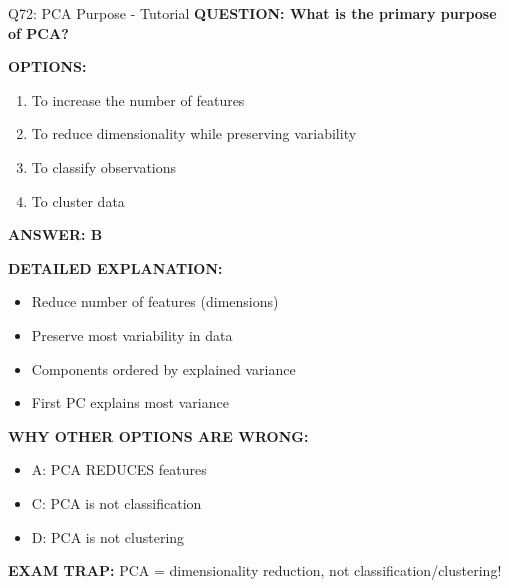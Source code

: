 \documentclass[8pt]{beamer}
\begin{document}
	\begin{frame}{Q72: PCA Purpose - Tutorial}
		\fontsize{6.5}{7.5}\selectfont
		\textbf{QUESTION: What is the primary purpose of PCA?}
		
		\vspace{0.1cm}
		\textbf{OPTIONS:}
		\begin{enumerate}
			\item To increase the number of features
			\item To reduce dimensionality while preserving variability
			\item To classify observations
			\item To cluster data
		\end{enumerate}
		
		\vspace{0.1cm}
		\textcolor{myblue}{\textbf{ANSWER: B}}
		
		\vspace{0.1cm}
		\textbf{DETAILED EXPLANATION:}
		\begin{itemize}
			\item Reduce number of features (dimensions)
			\item Preserve most variability in data
			\item Components ordered by explained variance
			\item First PC explains most variance
		\end{itemize}
		
		\vspace{0.1cm}
		\textcolor{myred}{\textbf{WHY OTHER OPTIONS ARE WRONG:}}
		\begin{itemize}
			\item \textcolor{myred}{A:} PCA REDUCES features
			\item \textcolor{myred}{C:} PCA is not classification
			\item \textcolor{myred}{D:} PCA is not clustering
		\end{itemize}
		
		\textcolor{myred}{\textbf{EXAM TRAP:}} PCA = \textcolor{myblue}{dimensionality reduction, not classification/clustering}!
	\end{frame}
	
\end{document}

